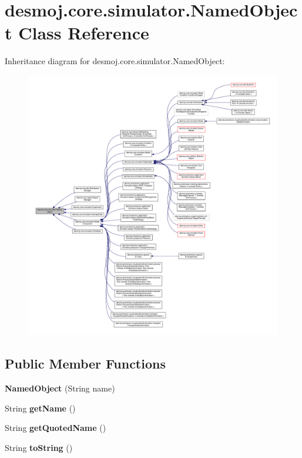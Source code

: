 \section{desmoj.\-core.\-simulator.\-Named\-Object Class Reference}
\label{classdesmoj_1_1core_1_1simulator_1_1_named_object}


Inheritance diagram for desmoj.\-core.\-simulator.\-Named\-Object\-:
\nopagebreak
\begin{figure}[H]
\begin{center}
\leavevmode
\includegraphics[width=350pt]{classdesmoj_1_1core_1_1simulator_1_1_named_object__inherit__graph}
\end{center}
\end{figure}
\subsection*{Public Member Functions}
\begin{DoxyCompactItemize}
\item 
{\bf Named\-Object} (String name)
\item 
String {\bf get\-Name} ()
\item 
String {\bf get\-Quoted\-Name} ()
\item 
String {\bf to\-String} ()
\end{DoxyCompactItemize}
